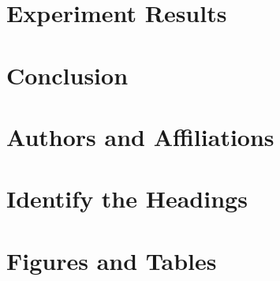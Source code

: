 \documentclass[conference]{IEEEtran}
\begin{document}


\section{Experiment Results}

\section{Conclusion}


\section{Authors and Affiliations}


\section{Identify the Headings}


\section{Figures and Tables}





\end{document}
